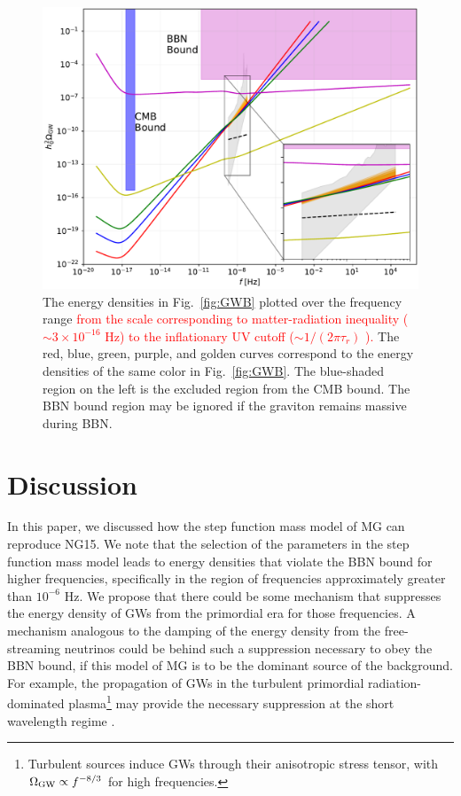 \documentclass[prd,twocolumn,aps,psfig,nofootinbib,nobibnotes,superscriptaddress,preprintnumbers,times]{revtex4-2}
\def\red{\textcolor{red}}
\begin{document}
\begin{figure}[ht]
    \includegraphics[width=\linewidth]{fig4.pdf}
    \caption{The energy densities in Fig.\ \ref{fig:GWB} plotted over the frequency range \red{from the scale corresponding to matter-radiation inequality ($\sim 3\times10^{-16}$ Hz) to the inflationary UV cutoff ($\sim 1/(2\pi\tau_r)$ \cite{Fujita:2018ehq}).} The red, blue, green, purple, and golden curves correspond to the energy densities of the same color in Fig.\ \ref{fig:GWB}. The blue-shaded region on the left is the excluded region from the CMB bound. The BBN bound region may be ignored if the graviton remains massive during BBN.} 
    \label{fig:supp}
\end{figure}

\section{Discussion}\label{sec:discussion}
In this paper, we discussed how the step function mass model of MG can reproduce NG15. We note that the selection of the parameters in the step function mass model leads to energy densities that violate the BBN bound for higher frequencies, specifically in the region of frequencies approximately greater than $10^{-6}$ Hz. We propose that there could be some mechanism that suppresses the energy density of GWs from the primordial era for those frequencies. A mechanism analogous to the damping of the energy density from the free-streaming neutrinos \cite{Durrer:1997ta,Weinberg:2003ur} could be behind such a suppression necessary to obey the BBN bound, if this model of MG is to be the dominant source of the background. For example, the propagation of GWs in the turbulent primordial radiation-dominated plasma\footnote{Turbulent sources induce GWs through their anisotropic stress tensor, with $\Omega_{\rm GW} \propto f^{-8/3}$ for high frequencies.} \cite{RoperPol:2019wvy} may provide the necessary suppression at the short wavelength regime \cite{Deryagin:1986}. 
\end{document}
